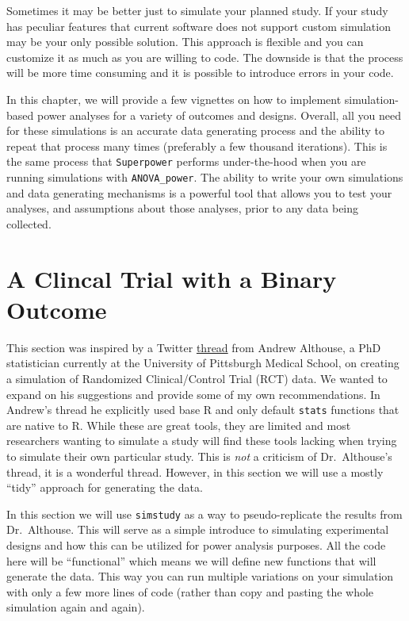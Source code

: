 \documentclass[
]{book}
\begin{document}
Sometimes it may be better just to simulate your planned study. If your study has peculiar features that current software does not support custom simulation may be your only possible solution. This approach is flexible and you can customize it as much as you are willing to code. The downside is that the process will be more time consuming and it is possible to introduce errors in your code.

In this chapter, we will provide a few vignettes on how to implement simulation-based power analyses for a variety of outcomes and designs. Overall, all you need for these simulations is an accurate data generating process and the ability to repeat that process many times (preferably a few thousand iterations). This is the same process that \texttt{Superpower} performs under-the-hood when you are running simulations with \texttt{ANOVA\_power}. The ability to write your own simulations and data generating mechanisms is a powerful tool that allows you to test your analyses, and assumptions about those analyses, prior to any data being collected.

\hypertarget{a-clincal-trial-with-a-binary-outcome}{%
\section{A Clincal Trial with a Binary Outcome}\label{a-clincal-trial-with-a-binary-outcome}}

This section was inspired by a Twitter \href{https://twitter.com/ADAlthousePhD/status/1353819045829742593?s=20}{thread} from Andrew Althouse, a PhD statistician currently at the University of Pittsburgh Medical School, on creating a simulation of Randomized Clinical/Control Trial (RCT) data. We wanted to expand on his suggestions and provide some of my own recommendations. In Andrew's thread he explicitly used base R and only default \texttt{stats} functions that are native to R. While these are great tools, they are limited and most researchers wanting to simulate a study will find these tools lacking when trying to simulate their own particular study. This is \emph{not} a criticism of Dr.~Althouse's thread, it is a wonderful thread. However, in this section we will use a mostly ``tidy'' approach for generating the data.

In this section we will use \texttt{simstudy} as a way to pseudo-replicate the results from Dr.~Althouse. This will serve as a simple introduce to simulating experimental designs and how this can be utilized for power analysis purposes. All the code here will be ``functional'' which means we will define new functions that will generate the data. This way you can run multiple variations on your simulation with only a few more lines of code (rather than copy and pasting the whole simulation again and again).
\end{document}
